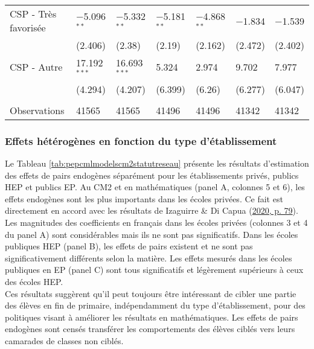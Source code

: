 \documentclass[
]{book}
\begin{document}
\begin{ThreePartTable}
\begin{longtable}[t]{lllllll}
\hspace{1em}CSP - Très favorisée & $-$5.096$^{**}$ & $-$5.332$^{**}$ & $-$5.181$^{**}$ & $-$4.868$^{**}$ & $-$1.834 & $-$1.539\\
\hspace{1em} & (2.406) & (2.38) & (2.19) & (2.162) & (2.472) & (2.402)\\
\hspace{1em}CSP - Autre & 17.192$^{***}$ & 16.693$^{***}$ & 5.324 & 2.974 & 9.702 & 7.977\\
\hspace{1em} & (4.294) & (4.207) & (6.399) & (6.26) & (6.277) & (6.047)\\
 &  &  &  &  &  & \\
Observations & 41565 & 41565 & 41496 & 41496 & 41342 & 41342\\*
\end{longtable}
\end{ThreePartTable}
\endgroup{}

\hypertarget{peresendohetero}{%
\subsubsection{Effets hétérogènes en fonction du type d'établissement}\label{peresendohetero}}

\quad Le Tableau \ref{tab:pepcmlmodelscm2statutreseau} présente les résultats d'estimation des effets de pairs endogènes séparément pour les établissements privés, publics HEP et publics EP. Au CM2 et en mathématiques (panel A, colonnes 5 et 6), les effets endogènes sont les plus importants dans les écoles privées. Ce fait est directement en accord avec les résultats de Izaguirre \& Di Capua (\protect\hyperlink{ref-IZA:DIC:20}{2020, p. 79}). Les magnitudes des coefficients en français dans les écoles privées (colonnes 3 et 4 du panel A) sont considérables mais ils ne sont pas significatifs. Dans les écoles publiques HEP (panel B), les effets de pairs existent et ne sont pas significativement différents selon la matière. Les effets mesurés dans les écoles publiques en EP (panel C) sont tous significatifs et légèrement supérieurs à ceux des écoles HEP.\\
Ces résultats suggèrent qu'il peut toujours être intéressant de cibler une partie des élèves en fin de primaire, indépendamment du type d'établissement, pour des politiques visant à améliorer les résultats en mathématiques. Les effets de pairs endogènes sont censés transférer les comportements des élèves ciblés vers leurs camarades de classes non ciblés.
\end{document}
